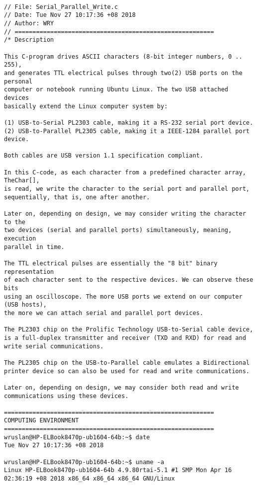 \begin{lstlisting}[caption={App4-Concurrent Writes to Parallel and Serial Ports}, label=App4-Concurrent Writes to Parallel and Serial Ports]

// File: Serial_Parallel_Write.c
// Date: Tue Nov 27 10:17:36 +08 2018
// Author: WRY
// ========================================================
/* Description

This C-program drives ASCII characters (8-bit integer numbers, 0 .. 255),
and generates TTL electrical pulses through two(2) USB ports on the personal
computer or notebook running Ubuntu Linux. The two USB attached devices 
basically extend the Linux computer system by: 

(1) USB-to-Serial PL2303 cable, making it a RS-232 serial port device.
(2) USB-to-Parallel PL2305 cable, making it a IEEE-1284 parallel port device.

Both cables are USB version 1.1 specification compliant.

In this C-code, as each character from a predefined character array, TheChar[],
is read, we write the character to the serial port and parallel port, 
sequentially, that is, one after another. 

Later on, depending on design, we may consider writing the character to the
two devices (serial and parallel ports) simultaneously, meaning, execution
parallel in time. 

The TTL electrical pulses are essentially the "8 bit" binary representation
of each character sent to the respective devices. We can observe these bits
using an oscilloscope. The more USB ports we extend on our computer (USB hosts), 
the more we can attach serial and parallel port devices. 

The PL2303 chip on the Prolific Technology USB-to-Serial cable device, 
is a full-duplex transmitter and receiver (TXD and RXD) for read and 
write serial communications.

The PL2305 chip on the USB-to-Parallel cable emulates a Bidirectional
printer device so can also be used for read and write communications. 

Later on, depending on design, we may consider both read and write 
communications using these devices. 

===========================================================
COMPUTING ENVIRONMENT
===========================================================
wruslan@HP-ELBook8470p-ub1604-64b:~$ date
Tue Nov 27 10:17:36 +08 2018

wruslan@HP-ELBook8470p-ub1604-64b:~$ uname -a
Linux HP-ELBook8470p-ub1604-64b 4.9.80rtai-5.1 #1 SMP Mon Apr 16 02:36:19 +08 2018 x86_64 x86_64 x86_64 GNU/Linux


\end{lstlisting}
